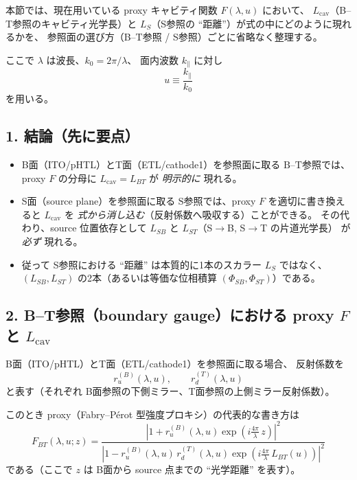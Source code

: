 本節では、現在用いている proxy キャビティ関数 \(F(\lambda,u)\) において、
\(\boxed{L_{\mathrm{cav}}}\)（B--T参照のキャビティ光学長）と
\(\boxed{L_S}\)（S参照の ``距離''）が式の中にどのように現れるかを、
参照面の選び方（B--T参照 / S参照）ごとに省略なく整理する。

ここで \(\lambda\) は波長、\(k_0=2\pi/\lambda\)、
面内波数 \(k_\parallel\) に対し
\begin{equation}
u\equiv \frac{k_\parallel}{k_0}
\end{equation}
を用いる。

\subsection*{1. 結論（先に要点）}

\begin{itemize}
\item B面（ITO/pHTL）とT面（ETL/cathode1）を参照面に取る
\(\boxed{\text{B--T参照}}\)では、proxy \(F\) の分母に
\(\boxed{L_{\mathrm{cav}}=L_{BT}}\) が \emph{明示的に} 現れる。
\item S面（source plane）を参照面に取る
\(\boxed{\text{S参照}}\)では、proxy \(F\) を適切に書き換えると
\(\boxed{L_{\mathrm{cav}}}\) を \emph{式から消し込む}（反射係数へ吸収する）ことができる。
その代わり、source 位置依存として
\(\boxed{L_{SB}}\) と \(\boxed{L_{ST}}\)（S\(\rightarrow\)B, S\(\rightarrow\)T の片道光学長）
が \emph{必ず} 現れる。
\item 従って S参照における ``距離'' は本質的に1本のスカラー \(L_S\) ではなく、
\(\boxed{(L_{SB},L_{ST})}\) の2本（あるいは等価な位相積算 \((\Phi_{SB},\Phi_{ST})\)）である。
\end{itemize}

\subsection*{2. B--T参照（boundary gauge）における proxy \(F\) と \(L_{\mathrm{cav}}\)}

B面（ITO/pHTL）とT面（ETL/cathode1）を参照面に取る場合、
反射係数を
\begin{equation}
r_u^{(B)}(\lambda,u),\qquad r_d^{(T)}(\lambda,u)
\end{equation}
と表す（それぞれ B面参照の下側ミラー、T面参照の上側ミラー反射係数）。

このとき proxy（Fabry--Pérot 型強度プロキシ）の代表的な書き方は
\begin{equation}
\boxed{
F_{BT}(\lambda,u;z)
=
\frac{
\left|1+r_u^{(B)}(\lambda,u)\exp\!\left(i\frac{4\pi}{\lambda}\,z\right)\right|^2
}{
\left|1-r_u^{(B)}(\lambda,u)\,r_d^{(T)}(\lambda,u)\exp\!\left(i\frac{4\pi}{\lambda}\,L_{BT}(u)\right)\right|^2
}
}
\label{eq:F_BT_FP}
\end{equation}
である（ここで \(z\) は B面から source 点までの ``光学距離'' を表す）。

